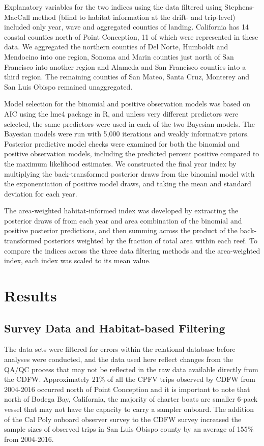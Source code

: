 \documentclass[
  12pt,
  authoryear,
  preprint,
  3p]{elsarticle}
\begin{document}
Explanatory variables for the two indices using the data filtered using
Stephens-MacCall method (blind to habitat information at the drift- and
trip-level) included only year, wave and aggregated counties of landing.
California has 14 coastal counties north of Point Conception, 11 of
which were represented in these data. We aggregated the northern
counties of Del Norte, Humboldt and Mendocino into one region, Sonoma
and Marin counties just north of San Francisco into another region and
Alameda and San Francisco counties into a third region. The remaining
counties of San Mateo, Santa Cruz, Monterey and San Luis Obispo remained
unaggregated.

Model selection for the binomial and positive observation models was
based on AIC using the lme4 package in R, and unless very different
predictors were selected, the same predictors were used in each of the
two Bayesian models. The Bayesian models were run with 5,000 iterations
and weakly informative priors. Posterior predictive model checks were
examined for both the binomial and positive observation models,
including the predicted percent positive compared to the maximum
likelihood estimates. We constructed the final year index by multiplying
the back-transformed posterior draws from the binomial model with the
exponentiation of positive model draws, and taking the mean and standard
deviation for each year.

The area-weighted habitat-informed index was developed by extracting the
posterior draws of from each year and area combination of the binomial
and positive posterior predictions, and then summing across the product
of the back-transformed posteriors weighted by the fraction of total
area within each reef. To compare the indices across the three data
filtering methods and the area-weighted index, each index was scaled to
its mean value.

\hypertarget{results}{%
\section{Results}\label{results}}

\hypertarget{survey-data-and-habitat-based-filtering-1}{%
\subsection{Survey Data and Habitat-based
Filtering}\label{survey-data-and-habitat-based-filtering-1}}

The data sets were filtered for errors within the relational database
before analyses were conducted, and the data used here reflect changes
from the QA/QC process that may not be reflected in the raw data
available directly from the CDFW. Approximately 21\% of all the CPFV
trips observed by CDFW from 2004-2016 occurred north of Point Conception
and it is important to note that north of Bodega Bay, California, the
majority of charter boats are smaller 6-pack vessel that may not have
the capacity to carry a sampler onboard. The addition of the Cal Poly
onboard observer survey to the CDFW survey increased the sample sizes of
observed trips in San Luis Obispo county by an average of 155\% from
2004-2016.
\end{document}

